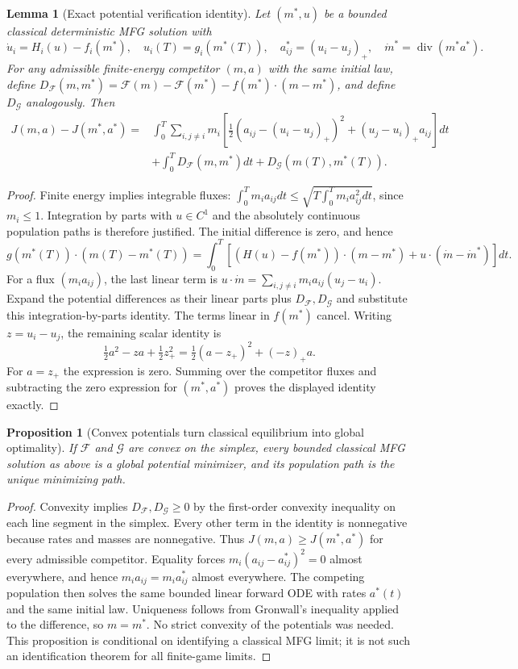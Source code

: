 \documentclass[11pt,a4paper]{article}
\newtheorem{lemma}[theorem]{Lemma}
\newtheorem{proposition}[theorem]{Proposition}
\theoremstyle{definition}
\theoremstyle{remark}
\begin{document}
\begin{lemma}[Exact potential verification identity]
Let $(m^*,u)$ be a bounded classical deterministic MFG solution with
\[
 \dot u_i=H_i(u)-f_i(m^*),\quad u_i(T)=g_i(m^*(T)),\quad
 a^*_{ij}=(u_i-u_j)_+,\quad \dot m^*=\operatorname{div}(m^*a^*).
\]
For any admissible finite-energy competitor $(m,a)$ with the same initial law, define
$D_{\mathcal F}(m,m^*)=\mathcal F(m)-\mathcal F(m^*)-f(m^*)\cdot(m-m^*)$, and define $D_{\mathcal G}$ analogously. Then
\begin{align*}
 J(m,a)-J(m^*,a^*)={}&\int_0^T\sum_{i,j\ne i}m_i
 \left[\tfrac12(a_{ij}-(u_i-u_j)_+)^2+(u_j-u_i)_+a_{ij}\right]dt\\
 &+\int_0^TD_{\mathcal F}(m,m^*)dt
 +D_{\mathcal G}(m(T),m^*(T)).
\end{align*}
\end{lemma}
\begin{proof}
Finite energy implies integrable fluxes: $\int_0^Tm_i a_{ij}dt\leq
\sqrt{T\int_0^Tm_i a_{ij}^2dt}$, since $m_i\leq1$. Integration by parts with $u\in C^1$ and the absolutely continuous population paths is therefore justified. The initial difference is zero, and hence
\[
 g(m^*(T))\cdot(m(T)-m^*(T))
 =\int_0^T\left[(H(u)-f(m^*))\cdot(m-m^*)
       +u\cdot(\dot m-\dot m^*)\right]dt.
\]
For a flux $(m_i a_{ij})$, the last linear term is
$u\cdot\dot m=\sum_{i,j\ne i}m_i a_{ij}(u_j-u_i)$.
Expand the potential differences as their linear parts plus $D_{\mathcal F},D_{\mathcal G}$ and substitute this integration-by-parts identity. The terms linear in $f(m^*)$ cancel. Writing $z=u_i-u_j$, the remaining scalar identity is
\[
 \tfrac12a^2-za+\tfrac12z_+^2
 =\tfrac12(a-z_+)^2+(-z)_+a.
\]
For $a=z_+$ the expression is zero. Summing over the competitor fluxes and subtracting the zero expression for $(m^*,a^*)$ proves the displayed identity exactly.
\end{proof}

\begin{proposition}[Convex potentials turn classical equilibrium into global optimality]
If $\mathcal F$ and $\mathcal G$ are convex on the simplex, every bounded classical MFG solution as above is a global potential minimizer, and its population path is the unique minimizing path.
\end{proposition}
\begin{proof}
Convexity implies $D_{\mathcal F},D_{\mathcal G}\geq0$ by the first-order convexity inequality on each line segment in the simplex. Every other term in the identity is nonnegative because rates and masses are nonnegative. Thus $J(m,a)\geq J(m^*,a^*)$ for every admissible competitor. Equality forces $m_i(a_{ij}-a^*_{ij})^2=0$ almost everywhere, and hence $m_i a_{ij}=m_i a^*_{ij}$ almost everywhere. The competing population then solves the same bounded linear forward ODE with rates $a^*(t)$ and the same initial law. Uniqueness follows from Gronwall's inequality applied to the difference, so $m=m^*$. No strict convexity of the potentials was needed. This proposition is conditional on identifying a classical MFG limit; it is not such an identification theorem for all finite-game limits.
\end{proof}
\end{document}
